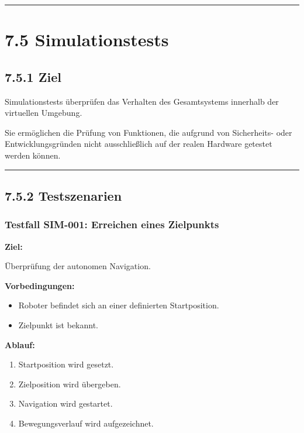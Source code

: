 \documentclass[
]{article}
\providecommand{\tightlist}{%
  \setlength{\itemsep}{0pt}\setlength{\parskip}{0pt}}
\begin{document}
\begin{center}\rule{0.5\linewidth}{0.5pt}\end{center}

\section{7.5 Simulationstests}\label{simulationstests}

\subsection{7.5.1 Ziel}\label{ziel-2}

Simulationstests überprüfen das Verhalten des Gesamtsystems innerhalb
der virtuellen Umgebung.

Sie ermöglichen die Prüfung von Funktionen, die aufgrund von
Sicherheits- oder Entwicklungsgründen nicht ausschließlich auf der
realen Hardware getestet werden können.

\begin{center}\rule{0.5\linewidth}{0.5pt}\end{center}

\subsection{7.5.2 Testszenarien}\label{testszenarien}

\subsubsection{Testfall SIM-001: Erreichen eines
Zielpunkts}\label{testfall-sim-001-erreichen-eines-zielpunkts}

\textbf{Ziel:}

Überprüfung der autonomen Navigation.

\textbf{Vorbedingungen:}

\begin{itemize}
\tightlist
\item
  Roboter befindet sich an einer definierten Startposition.
\item
  Zielpunkt ist bekannt.
\end{itemize}

\textbf{Ablauf:}

\begin{enumerate}
\def\labelenumi{\arabic{enumi}.}
\tightlist
\item
  Startposition wird gesetzt.
\item
  Zielposition wird übergeben.
\item
  Navigation wird gestartet.
\item
  Bewegungsverlauf wird aufgezeichnet.
\end{enumerate}
\end{document}
